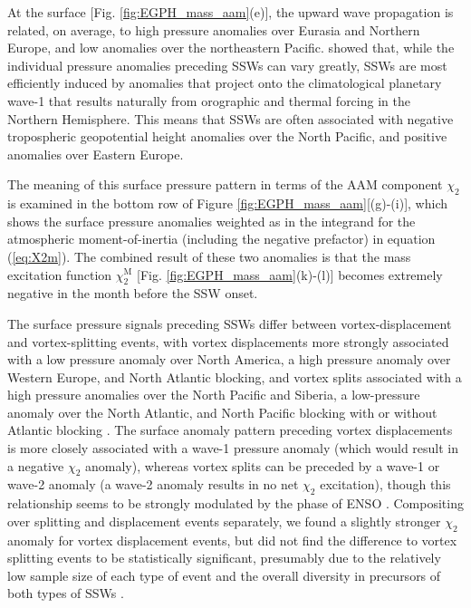 \documentclass[draft,jgrga]{agutex}
\begin{document}
\begin{article}
 {At the surface} [Fig. \ref{fig:EGPH_mass_aam}(e)],   {the upward wave propagation is related, on average, to high pressure anomalies over Eurasia and Northern Europe, and low anomalies over the northeastern Pacific.}
\cite{Garfinkel2010}  {showed that, while the individual pressure anomalies preceding SSWs can vary greatly, SSWs are most efficiently induced by anomalies that project onto the climatological planetary wave-1 that results naturally from orographic and thermal forcing in the Northern Hemisphere.}
 {This means that SSWs are often associated with negative tropospheric geopotential height anomalies over the North Pacific, and positive anomalies over Eastern Europe.}

 {The meaning of this surface pressure pattern in terms of the AAM component $\chi_2$ is examined in the bottom row of Figure} \ref{fig:EGPH_mass_aam}[(g)-(i)],  {which shows the surface pressure anomalies weighted as in the integrand for the atmospheric moment-of-inertia (including the negative prefactor)} in equation (\ref{eq:X2m}).  
 {The combined result of these two anomalies is that} the  {mass} excitation function $\chi_2^{\text{M}}$ [Fig. \ref{fig:EGPH_mass_aam}(k)-(l)] becomes extremely negative in the month before the SSW onset.

 {The surface pressure signals preceding SSWs differ between vortex-displacement and vortex-splitting events, with vortex displacements more strongly associated with a low pressure anomaly over North America, a high pressure anomaly over Western Europe, and North Atlantic blocking, and vortex splits associated with a high pressure anomalies over the North Pacific and Siberia,  a low-pressure anomaly over the North Atlantic, and North Pacific blocking with or without Atlantic blocking} \citep{martiusetal2009,Mitchell2012}.
 {The surface anomaly pattern preceding vortex displacements is more closely associated with a wave-1 pressure anomaly (which would result in a negative $\chi_2$ anomaly), whereas vortex splits can be preceded by a wave-1 or wave-2 anomaly} \citep{bancalaetal2012,martiusetal2009}  {(a wave-2 anomaly results in no net $\chi_2$ excitation), though this relationship seems to be strongly modulated by the phase of ENSO} \citep{Barriopedro2014}.  
 {Compositing over splitting and displacement events separately, we found a slightly stronger $\chi_2$ anomaly for vortex displacement events, but did not find the difference to vortex splitting events to be statistically significant, presumably due to the relatively low sample size of each type of event and  the overall diversity in precursors of both types of SSWs}  \citep{Barriopedro2014}.
  

\end{article}
\end{document}
